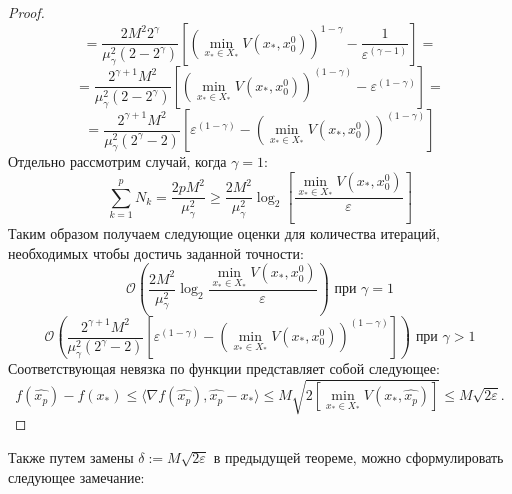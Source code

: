 \begin{proof}
$$       $$
       $$
           = \frac{2 M^2 2^{\gamma}}{\mu_{\gamma}^2 (2 - 2^{\gamma})} \left[\left(\min\limits_{x_* \in X_*}{V(x_*, x_0^0)}\right)^{1 - \gamma} - \frac{1}{\varepsilon^{(\gamma-1)}}\right] = 
       $$
       $$
           = \frac{2^{\gamma + 1} M^2}{\mu_{\gamma}^2 (2 - 2^{\gamma})} \left[\left(\min\limits_{x_* \in X_*}{V(x_*, x_0^0)}\right)^{(1 - \gamma)} - \varepsilon^{(1 - \gamma)}\right] = 
       $$
       $$
           = \frac{2^{\gamma + 1} M^2}{\mu_{\gamma}^2 (2^{\gamma} - 2)} \left[\varepsilon^{(1 - \gamma)} - \left(\min\limits_{x_* \in X_*}{V(x_*, x_0^0)}\right)^{(1 - \gamma)}\right]
       $$
       Отдельно рассмотрим случай, когда $\gamma = 1$:
       $$
           \sum_{k=1}^{p} N_k = \frac{2 p M^2}{\mu_{\gamma}^2} \geq \frac{2 M^2}{\mu_{\gamma}^2} \log_2{\left[\frac{\min\limits_{x_* \in X_*}{V(x_*, x_0^0)}}{\varepsilon}\right]}
       $$
       Таким образом получаем следующие оценки для количества итераций, необходимых чтобы достичь заданной точности:
       $$
           \mathcal{O} \left(\frac{2 M^2}{\mu_{\gamma}^2} \log_2{\frac{\min\limits_{x_* \in X_*}{V(x_*, x_0^0)}}{\varepsilon}}\right) \text{ при } \gamma = 1
       $$
       $$
           \mathcal{O} \left(\frac{2^{\gamma + 1} M^2}{\mu_{\gamma}^2 (2^{\gamma} - 2)} \left[\varepsilon^{(1 - \gamma)} - \left(\min\limits_{x_* \in X_*}{V(x_*, x_0^0)}\right)^{(1 - \gamma)}\right]\right) \text{ при } \gamma > 1
       $$
       Соответствующая невязка по функции представляет собой следующее:
       $$
            f(\widehat{x_p}) - f(x_*) \leq  \langle \nabla f(\widehat{x_p}), \widehat{x_p} - x_* \rangle \leq M \sqrt{ 2 \left[\min_{x_* \in X_*}{V(x_*, \widehat{x_p})}\right]} \leq M \sqrt{2 \varepsilon}.  
        $$
    \end{proof}
    Также путем замены $\delta := M \sqrt{2 \varepsilon}$ в предыдущей теореме, можно сформулировать следующее замечание:
